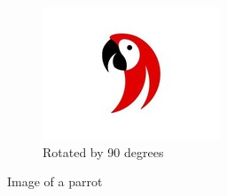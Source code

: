 \documentclass{article}
\begin{document}
\begin{figure}
	\begin{subfigure}{0.3\textwidth}
	\centering
	\includegraphics[width=\textwidth, angle=90]{parrot.jpeg}
	\caption{Rotated by 90 degrees}
\end{subfigure}

		\caption{Image of a parrot}
	\end{figure}
\end{document}
